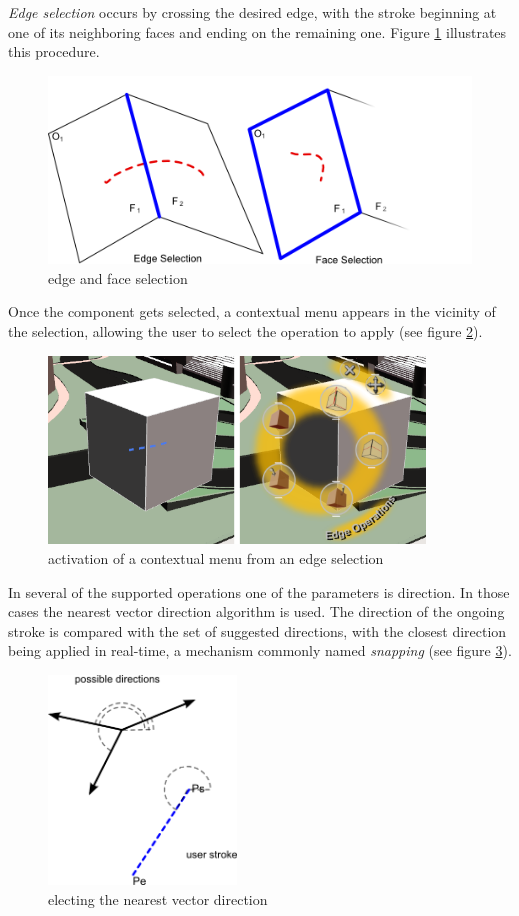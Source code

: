 \emph{Edge selection} occurs by crossing the desired edge, with the stroke beginning
at one of its neighboring faces and ending on the remaining one.
Figure \ref{fig:selection} illustrates this procedure.

\begin{figure}[!ht]
	\centering
	\includegraphics[width=12cm]{gfx/face-edge-selection.png}
	\caption{edge and face selection}
	\label{fig:selection}
\end{figure}

Once the component gets selected, a contextual menu appears in the vicinity
of the selection, allowing the user to select the operation to apply (see figure \ref{fig:contextual}).

\begin{figure}[!ht]
	\centering
	\includegraphics[width=10cm]{gfx/contextual.png}
	\caption{activation of a contextual menu from an edge selection}
	\label{fig:contextual}
\end{figure}

In several of the supported operations one of the parameters is direction.
In those cases the nearest vector direction algorithm is used.
The direction of the ongoing stroke is compared with the set of suggested directions,
with the closest direction being applied in real-time, a mechanism commonly
named \textit{snapping} (see figure \ref{fig:election}).

\begin{figure}[!ht]
	\centering
	\includegraphics[width=5cm]{gfx/election.png}
	\caption{electing the nearest vector direction}
	\label{fig:election}
\end{figure}

